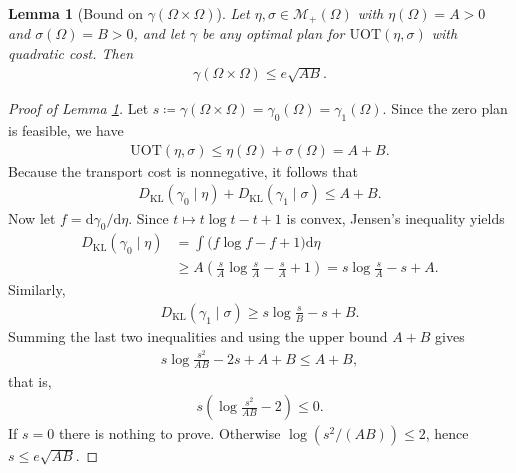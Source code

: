 \documentclass[11pt,reqno]{amsart}
\newtheorem{lemma}[theorem]{Lemma}
\theoremstyle{definition}
\newcommand{\KL}{\mathrm{KL}}
\renewcommand{\d}{\mathrm{d}}
\begin{document}
\begin{lemma}[Bound on $\gamma(\Omega\times\Omega)$]
\label{lem:uot_plan_mass_bound}
Let $\eta,\sigma \in \mathcal{M}_+(\Omega)$ with $\eta(\Omega)=A>0$ and $\sigma(\Omega)=B>0$, and let $\gamma$ be any optimal plan for $\mathrm{UOT}(\eta,\sigma)$ with quadratic cost. Then
\begin{align}
    \gamma(\Omega\times\Omega) \le e\sqrt{AB}.
\end{align}
\end{lemma}


\begin{proof}[Proof of Lemma \ref{lem:uot_plan_mass_bound}]
Let $s \coloneqq \gamma(\Omega\times\Omega) = \gamma_0(\Omega)=\gamma_1(\Omega)$. Since the zero plan is feasible, we have
\begin{align}
    \mathrm{UOT}(\eta,\sigma) \le \eta(\Omega) + \sigma(\Omega) = A+B.
\end{align}
Because the transport cost is nonnegative, it follows that
\begin{align}
    {D_\KL}(\gamma_0\mid \eta) + {D_\KL}(\gamma_1\mid \sigma) \le A+B.
\end{align}
Now let $f = \d\gamma_0/\d\eta$. Since $t\mapsto t\log t - t + 1$ is convex, Jensen's inequality yields
\begin{align}
    {D_\KL}(\gamma_0\mid \eta)
    &= \int \bigl( f\log f - f + 1 \bigr) \d\eta \\
    &\ge A\left( \frac{s}{A}\log\frac{s}{A} - \frac{s}{A} + 1 \right)
     = s\log\frac{s}{A} - s + A.
\end{align}
Similarly,
\begin{align}
    {D_\KL}(\gamma_1\mid \sigma) \ge s\log\frac{s}{B} - s + B.
\end{align}
Summing the last two inequalities and using the upper bound $A+B$ gives
\begin{align}
    s\log\frac{s^2}{AB} - 2s + A+B \le A+B,
\end{align}
that is,
\begin{align}
    s\left( \log\frac{s^2}{AB} - 2 \right) \le 0.
\end{align}
If $s=0$ there is nothing to prove. Otherwise $\log(s^2/(AB))\le 2$, hence $s \le e\sqrt{AB}$.
\end{proof}
\end{document}
